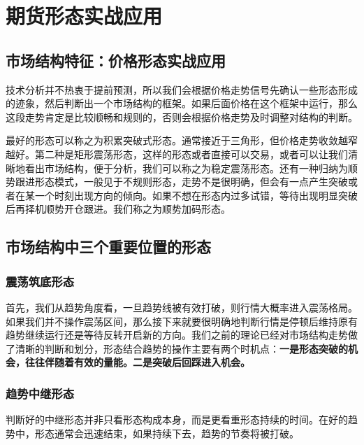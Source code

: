 \chapter{期货形态实战应用}
\section{市场结构特征：价格形态实战应用}
技术分析并不热衷于提前预测，所以我们会根据价格走势信号先确认一些形态形成的迹象，然后判断出一个市场结构的框架。如果后面价格在这个框架中运行，那么这段走势肯定是比较顺畅和规则的，否则会根据价格走势及时调整对结构的判断。

最好的形态可以称之为积累突破式形态。通常接近于三角形，但价格走势收敛越窄越好。第二种是矩形震荡形态，这样的形态或者直接可以交易，或者可以让我们清晰地看出市场结构，便于分析，我们可以称之为稳定震荡形态。还有一种归纳为顺势跟进形态模式，一般见于不规则形态，走势不是很明确，但会有一点产生突破或者在某一个时刻出现方向的倾向。如果不想在形态内过多试错，等待出现明显突破后再择机顺势开仓跟进。我们称之为顺势加码形态。
\section{市场结构中三个重要位置的形态}
\subsection{震荡筑底形态}
首先，我们从趋势角度看，一旦趋势线被有效打破，则行情大概率进入震荡格局。如果我们并不操作震荡区间，那么接下来就要很明确地判断行情是停顿后维持原有趋势继续运行还是等待反转开启新的方向。我们之前的理论已经对市场结构走势做了清晰的判断和划分，形态结合趋势的操作主要有两个时机点：\textbf{一是形态突破的机会，往往伴随着有效的量能。二是突破后回踩进入机会。}

\subsection{趋势中继形态}
判断好的中继形态并非只看形态构成本身，而是更看重形态持续的时间。在好的趋势中，形态通常会迅速结束，如果持续下去，趋势的节奏将被打破。
